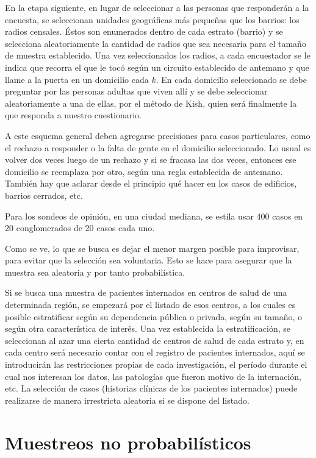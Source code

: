 \documentclass[]{book}
\begin{document}
En la etapa siguiente, en lugar de seleccionar a las personas que
responderán a la encuesta, se seleccionan unidades geográficas más pequeñas que los barrios: los radios censales. Éstos son enumerados dentro de cada estrato (barrio) y se selecciona aleatoriamente la cantidad de radios que sea necesaria para el tamaño de muestra establecido. Una vez seleccionados los radios, a cada encuestador se le indica que recorra el que le tocó según un circuito establecido de antemano y que llame a la puerta en un domicilio cada \(k\). En cada domicilio seleccionado se debe preguntar por las personas adultas que viven allí y se debe seleccionar aleatoriamente a una de ellas, por el método de Kish, quien será finalmente la que responda a nuestro cuestionario.

A este esquema general deben agregarse precisiones para casos
particulares, como el rechazo a responder o la falta de gente en el
domicilio seleccionado. Lo usual es volver dos veces luego de un rechazo y si se fracasa las dos veces, entonces ese domicilio se reemplaza por otro, según una regla establecida de antemano. También hay que aclarar desde el principio qué hacer en los casos de edificios, barrios cerrados, etc.

Para los sondeos de opinión, en una ciudad mediana, se estila usar 400
casos en 20 conglomerados de 20 casos cada uno.

Como se ve, lo que se busca es dejar el menor margen posible para
improvisar, para evitar que la selección sea voluntaria. Esto se hace
para asegurar que la muestra sea aleatoria y por tanto probabilística.

Si se busca una muestra de pacientes internados en centros de salud de
una determinada región, se empezará por el listado de esos centros, a
los cuales es posible estratificar según su dependencia pública o
privada, según su tamaño, o según otra característica de interés. Una
vez establecida la estratificación, se seleccionan al azar una cierta
cantidad de centros de salud de cada estrato y, en cada centro será
necesario contar con el registro de pacientes internados, aquí se
introducirán las restricciones propias de cada investigación, el período
durante el cual nos interesan los datos, las patologías que fueron
motivo de la internación, etc. La selección de casos (historias clínicas
de los pacientes internados) puede realizarse de manera irrestricta
aleatoria si se dispone del listado.

\hypertarget{muestreos-no-probabiluxedsticos}{%
\section{Muestreos no probabilísticos}\label{muestreos-no-probabiluxedsticos}}
\end{document}
